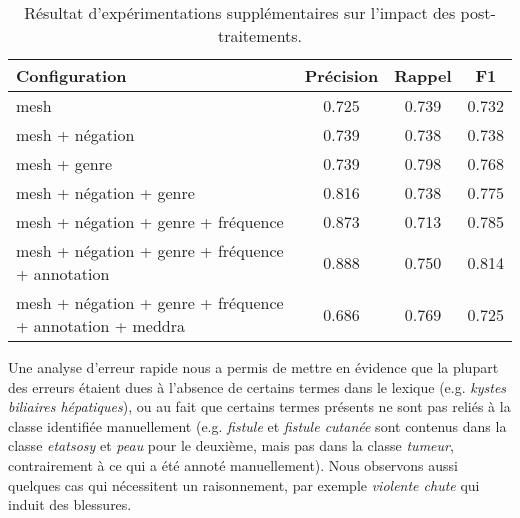 \begin{table}[htb]
    \centering
    \begin{tabular}{l|ccc}
        Configuration                                                                   & Précision   & Rappel      & F1          \\
        \hline
        \hline
        \acrshort{mesh}                                                                 & \num{0,725} & \num{0,739} & \num{0,732} \\
        \acrshort{mesh} + négation                                                      & \num{0,739} & \num{0,738} & \num{0,738} \\
        \acrshort{mesh} + genre                                                         & \num{0,739} & \num{0,798} & \num{0,768} \\
        \acrshort{mesh} + négation + genre                                              & \num{0,816} & \num{0,738} & \num{0,775} \\
        \acrshort{mesh} + négation + genre + fréquence                                  & \num{0,873} & \num{0,713} & \num{0,785} \\
        \acrshort{mesh} + négation + genre + fréquence + annotation                     & \num{0,888} & \num{0,750} & \num{0,814} \\
        \acrshort{mesh} + négation + genre + fréquence + annotation + \acrshort{meddra} & \num{0,686} & \num{0,769} & \num{0,725}
    \end{tabular}
    \caption{Résultat d'expérimentations supplémentaires sur l'impact des post-traitements.}
    \label{tab:class:result}
\end{table}

Une analyse d'erreur rapide nous a permis de mettre en évidence que la plupart des erreurs étaient dues à l'absence de certains termes dans le lexique (e.g. \emph{kystes biliaires hépatiques}), ou au fait que certains termes présents ne sont pas reliés à la classe identifiée manuellement (e.g. \emph{fistule} et \emph{fistule cutanée} sont contenus dans la classe \emph{etatsosy} et \emph{peau} pour le deuxième, mais pas dans la classe \emph{tumeur}, contrairement à ce qui a été annoté manuellement).
Nous observons aussi quelques cas qui nécessitent un raisonnement, par exemple \emph{violente chute} qui induit des blessures.

\FloatBarrier
